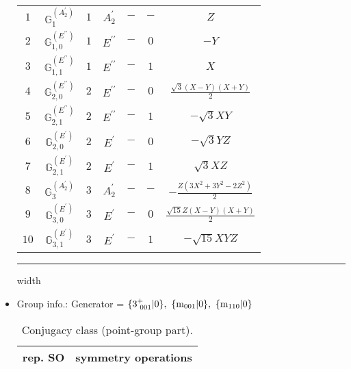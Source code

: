 \documentclass[fleqn,10pt,landscape]{article}
\begin{document}
\begin{itemize}
\begin{center}
\begin{longtable}{ccccccc}
$ 1 $ & $ \mathbb{G}_{1}^{(A_{2}^{\prime})} $ & $ 1 $ & $ A_{2}^{\prime} $ & $ - $ & $ - $ & $ Z $ \\
$ 2 $ & $ \mathbb{G}_{1,0}^{(E^{\prime\prime})} $ & $ 1 $ & $ E^{\prime\prime} $ & $ - $ & $ 0 $ & $ - Y $ \\
$ 3 $ & $ \mathbb{G}_{1,1}^{(E^{\prime\prime})} $ & $ 1 $ & $ E^{\prime\prime} $ & $ - $ & $ 1 $ & $ X $ \\ \hline
$ 4 $ & $ \mathbb{G}_{2,0}^{(E^{\prime\prime})} $ & $ 2 $ & $ E^{\prime\prime} $ & $ - $ & $ 0 $ & $ \frac{\sqrt{3} \left(X - Y\right) \left(X + Y\right)}{2} $ \\
$ 5 $ & $ \mathbb{G}_{2,1}^{(E^{\prime\prime})} $ & $ 2 $ & $ E^{\prime\prime} $ & $ - $ & $ 1 $ & $ - \sqrt{3} X Y $ \\
$ 6 $ & $ \mathbb{G}_{2,0}^{(E^{\prime})} $ & $ 2 $ & $ E^{\prime} $ & $ - $ & $ 0 $ & $ - \sqrt{3} Y Z $ \\
$ 7 $ & $ \mathbb{G}_{2,1}^{(E^{\prime})} $ & $ 2 $ & $ E^{\prime} $ & $ - $ & $ 1 $ & $ \sqrt{3} X Z $ \\ \hline
$ 8 $ & $ \mathbb{G}_{3}^{(A_{2}^{\prime})} $ & $ 3 $ & $ A_{2}^{\prime} $ & $ - $ & $ - $ & $ - \frac{Z \left(3 X^{2} + 3 Y^{2} - 2 Z^{2}\right)}{2} $ \\
$ 9 $ & $ \mathbb{G}_{3,0}^{(E^{\prime})} $ & $ 3 $ & $ E^{\prime} $ & $ - $ & $ 0 $ & $ \frac{\sqrt{15} Z \left(X - Y\right) \left(X + Y\right)}{2} $ \\
$ 10 $ & $ \mathbb{G}_{3,1}^{(E^{\prime})} $ & $ 3 $ & $ E^{\prime} $ & $ - $ & $ 1 $ & $ - \sqrt{15} X Y Z $ \\
\end{longtable}
\end{center}

 \hfil \hrule height 1mm width \textwidth \hfil

\item Group info.: Generator = $\{3^{+}_{\,\,001}|0\},\,\,\{{\rm m}_{001}|0\},\,\,\{{\rm m}_{110}|0\}$

\begin{center}
\renewcommand{\arraystretch}{1.3}
\begin{longtable}{c|l}
\caption{Conjugacy class (point-group part).}
 \\
 \hline \hline
rep. SO & symmetry operations \\ \hline \endfirsthead


\end{longtable}
\end{center}
\end{itemize}
\end{document}
